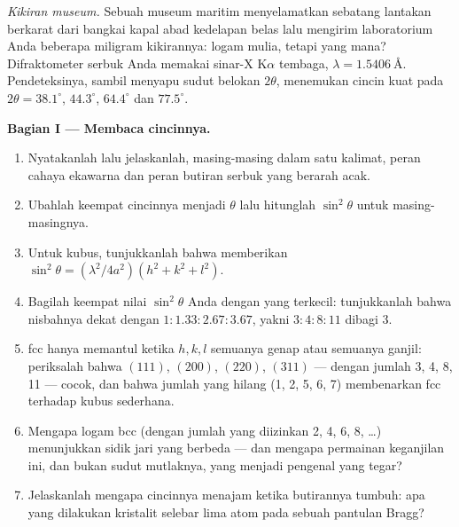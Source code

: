 \begin{problem}\label{pb:b3:crystalline-solids:1}
\emph{Kikiran museum.} Sebuah museum maritim menyelamatkan sebatang
lantakan berkarat dari bangkai kapal abad kedelapan belas lalu mengirim
laboratorium Anda beberapa miligram kikirannya: logam mulia, tetapi yang
mana? Difraktometer serbuk Anda memakai sinar-X K$\alpha$ tembaga,
$\lambda = \qty{1.5406}{\angstrom}$. Pendeteksinya, sambil menyapu
sudut belokan $2\theta$, menemukan cincin kuat pada $2\theta =
38.1^\circ$, $44.3^\circ$, $64.4^\circ$ dan $77.5^\circ$.

\medskip\noindent\textbf{Bagian I --- Membaca cincinnya.}

\begin{enumerate}
  \item Nyatakanlah  lalu jelaskanlah, masing-masing dalam
        satu kalimat, peran cahaya ekawarna dan peran butiran serbuk
        yang berarah acak.
  \item Ubahlah keempat cincinnya menjadi $\theta$ lalu hitunglah
        $\sin^2\theta$ untuk masing-masingnya.
  \item Untuk  kubus, tunjukkanlah bahwa  memberikan
        $\sin^2\theta = (\lambda^2/4a^2)(h^2 + k^2 + l^2)$.
  \item Bagilah keempat nilai $\sin^2\theta$ Anda dengan yang terkecil:
        tunjukkanlah bahwa nisbahnya dekat dengan $1 : 1.33 : 2.67 : 3.67$,
        yakni $3 : 4 : 8 : 11$ dibagi 3.
  \item {} fcc hanya memantul ketika $h, k, l$ semuanya genap atau
        semuanya ganjil: periksalah bahwa $(111)$, $(200)$, $(220)$, $(311)$ ---
        dengan jumlah 3, 4, 8, 11 --- cocok, dan bahwa jumlah yang hilang
        (1, 2, 5, 6, 7) membenarkan fcc terhadap kubus sederhana.
  \item Mengapa logam bcc (dengan jumlah yang diizinkan 2, 4, 6, 8, \dots)
        menunjukkan sidik jari yang berbeda --- dan mengapa permainan
        keganjilan ini, dan bukan sudut mutlaknya, yang menjadi pengenal
        yang tegar?
  \item Jelaskanlah mengapa cincinnya menajam ketika butirannya tumbuh:
        apa yang dilakukan kristalit selebar lima atom pada sebuah
        pantulan Bragg?
\end{enumerate}


\end{problem}
